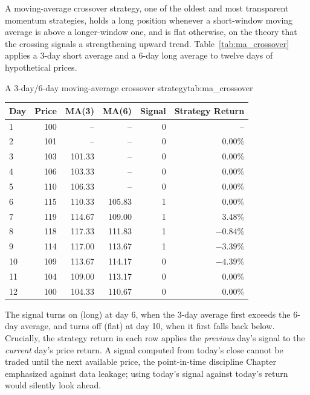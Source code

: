 \documentclass[../ai_in_finance]{subfiles}
\begin{document}
\label{sec:ma-crossover}

A moving-average crossover strategy, one of the oldest and most transparent momentum strategies, holds a long position whenever a short-window moving average is above a longer-window one, and is flat otherwise, on the theory that the crossing signals a strengthening upward trend. Table~\ref{tab:ma_crossover} applies a 3-day short average and a 6-day long average to twelve days of hypothetical prices.

\begin{booktable}[htbp]{A 3-day/6-day moving-average crossover strategy}{tab:ma_crossover}
\begin{tabular}{lrrrrr}
\toprule
Day & Price & MA(3) & MA(6) & Signal & Strategy Return \\
\midrule
1  & 100 & --     & --     & 0 & -- \\
2  & 101 & --     & --     & 0 & 0.00\% \\
3  & 103 & 101.33 & --     & 0 & 0.00\% \\
4  & 106 & 103.33 & --     & 0 & 0.00\% \\
5  & 110 & 106.33 & --     & 0 & 0.00\% \\
6  & 115 & 110.33 & 105.83 & 1 & 0.00\% \\
7  & 119 & 114.67 & 109.00 & 1 & 3.48\% \\
8  & 118 & 117.33 & 111.83 & 1 & $-0.84\%$ \\
9  & 114 & 117.00 & 113.67 & 1 & $-3.39\%$ \\
10 & 109 & 113.67 & 114.17 & 0 & $-4.39\%$ \\
11 & 104 & 109.00 & 113.17 & 0 & 0.00\% \\
12 & 100 & 104.33 & 110.67 & 0 & 0.00\% \\
\bottomrule
\end{tabular}
\end{booktable}

The signal turns on (long) at day 6, when the 3-day average first exceeds the 6-day average, and turns off (flat) at day 10, when it first falls back below. Crucially, the strategy return in each row applies the \emph{previous} day's signal to the \emph{current} day's price return. A signal computed from today's close cannot be traded until the next available price, the point-in-time discipline Chapter~ emphasized against data leakage; using today's signal against today's return would silently look ahead.
\end{document}
